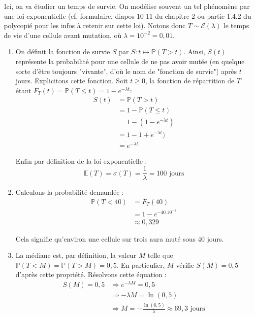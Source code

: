 \documentclass[a4paper,oneside,12pt]{article}
\theoremstyle{plain}
\def\P{{\mathbb P}}
\def\E{{\mathbb E}}
\begin{document}
Ici, on va étudier un temps de survie. On modélise souvent un tel phénomène par une loi exponentielle (cf. formulaire, diapos 10-11 du chapitre 2 ou partie 1.4.2 du polycopié pour les infos à retenir sur cette loi).
Notons donc $T \sim\mathcal{E}(\lambda)$ le temps de vie d'une cellule avant mutation, où $\lambda = 10^{-2} = 0,01$. 

\begin{enumerate}
    \item On définit la fonction de survie $S$ par $S:t\mapsto\P(T>t)$. Ainsi, $S(t)$ représente la probabilité pour une cellule de ne pas avoir mutée (en quelque sorte d'être toujours "vivante", d'où le nom de "fonction de survie") après $t$ jours. Explicitons cette fonction. Soit $t\ge 0$, la fonction de répartition de $T$ étant  $F_T(t) = \P(T\le t) = 1 - e^{-\lambda t}$:
    \begin{align*}
        S(t) &= \P(T>t)\\
        &= 1- \P(T\le t) \\
        &= 1 - (1 - e^{-\lambda t}) \\
        &= 1 - 1 + e^{-\lambda t})\\
        &= e^{-\lambda t}
    \end{align*}
    
    Enfin par définition de la loi exponentielle :
    $$\E(T) = \sigma(T) = \frac{1}{\lambda}= 100 \mbox{ jours}$$
    
    \item Calculons la probabilité demandée :
    \begin{align*}
        \P(T<40) &= F_T(40) \\
        &= 1- e^{-40.10^{-2}}\\
        &\approx 0,329
    \end{align*}
    
    Cela signifie qu'environ une cellule sur trois aura muté sous 40 jours.
    
    \item La médiane est, par définition, la valeur $M$ telle que $\P(T<M) = \P(T>M) = 0,5$. En particulier, $M$ vérifie $S(M) = 0,5$ d'après cette propriété. Résolvons cette équation :
    \begin{align*}
        S(M) = 0,5 &\Rightarrow e^{-\lambda M} = 0,5\\
        &\Rightarrow-\lambda M = \ln(0,5)\\
        &\Rightarrow M = -\frac{\ln(0,5)}{\lambda} \approx 69,3 \mbox{ jours}
    \end{align*}
    

\end{enumerate}
\end{document}
